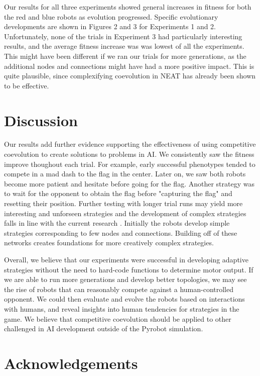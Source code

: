 \documentclass[11pt]{article}
\begin{document}
Our results for all three experiments showed general increases in fitness for both the red and blue robots as evolution progressed. Specific evolutionary developments are shown in Figures 2 and 3 for Experiments 1 and 2. Unfortunately, none of the trials in Experiment 3 had particularly interesting results, and the average fitness increase was was lowest of all the experiments. This might have been different if we ran our trials for more generations, as the additional nodes and connections might have had a more positive impact. This is quite plausible, since complexifying coevolution in NEAT has already been shown to be effective.

\section{Discussion}

Our results add further evidence supporting the effectiveness of using competitive coevolution to create solutions to problems in AI. We consistently saw the fitness improve thoughout each trial.  For example, early successful phenotypes tended to compete in a mad dash to the flag in the center.  Later on, we saw both robots become more patient and hesitate before going for the flag.  Another strategy was to wait for the opponent to obtain the flag before "capturing the flag" and resetting their position. Further testing with longer trial runs may yield more interesting and unforseen strategies and the development of complex strategies falls in line with the current research \cite{NEAT}.  Initially the robots develop simple strategies corresponding to few nodes and connections. Building off of these networks creates foundations for more creatively complex strategies. 

Overall, we believe that our experiments were successful in developing adaptive strategies without the need to hard-code functions to determine motor output. If we are able to run more generations and develop better topologies, we may see the rise of robots that can reasonably compete against a human-controlled opponent. We could then evaluate and evolve the robots based on interactions with humans, and reveal insights into human tendencies for strategies in the game. We believe that competitive coevolution should be applied to other challenged in AI development outside of the Pyrobot simulation.

\section{Acknowledgements}
\end{document}
